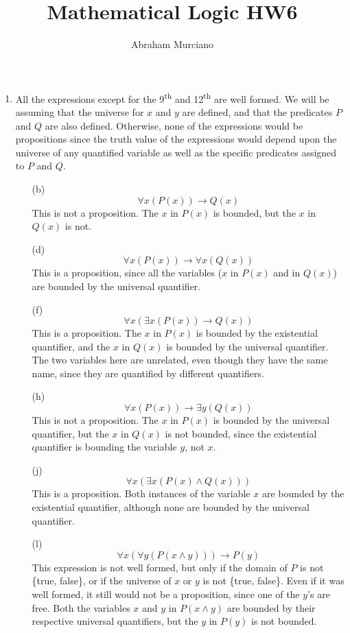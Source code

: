\documentclass[fleqn]{article}
\title{Mathematical Logic HW6}
\author{Abraham Murciano}
\begin{document}
\maketitle

\begin{enumerate}

	\item %
	All the expressions except for the 9\textsuperscript{th} and 12\textsuperscript{th} are well formed. We will be assuming that the universe for \(x\) and \(y\) are defined, and that the predicates \(P\) and \(Q\) are also defined. Otherwise, none of the expressions would be propositions since the truth value of the expressions would depend upon the universe of any quantified variable as well as the specific predicates assigned to \(P\) and \(Q\).
	
	\begin{enumerate}
		\item[(b)]
		\[\forall x (P(x)) \to Q(x)\]
		This is not a proposition. The \(x\) in \(P(x)\) is bounded, but the \(x\) in \(Q(x)\) is not.

		\item[(d)]
		\[\forall x (P(x)) \to \forall x (Q(x))\]
		This is a proposition, since all the variables (\(x\) in \(P(x)\) and in \(Q(x)\)) are bounded by the universal quantifier.

		\item[(f)]
		\[\forall x (\exists x (P(x)) \to Q(x))\]
		This is a proposition. The \(x\) in \(P(x)\) is bounded by the existential quantifier, and the \(x\) in \(Q(x)\) is bounded by the universal quantifier. The two variables here are unrelated, even though they have the same name, since they are quantified by different quantifiers.

		\item[(h)]
		\[\forall x (P(x)) \to \exists y (Q(x))\]
		This is not a proposition. The \(x\) in \(P(x)\) is bounded by the universal quantifier, but the \(x\) in \(Q(x)\) is not bounded, since the existential quantifier is bounding the variable \(y\), not \(x\).

		\item[(j)]
		\[\forall x (\exists x (P(x) \land Q(x)))\]
		This is a proposition. Both instances of the variable \(x\) are bounded by the existential quantifier, although none are bounded by the universal quantifier.

		\item[(l)]
		\[\forall x (\forall y (P(x \land y))) \to P(y)\]
		This expression is not well formed, but only if the domain of \(P\) is not \{true, false\}, or if the universe of \(x\) or \(y\) is not \{true, false\}. Even if it was well formed, it still would not be a proposition, since one of the \(y\)'s are free. Both the variables \(x\) and \(y\) in \(P(x \land y)\) are bounded by their respective universal quantifiers, but the \(y\) in \(P(y)\) is not bounded.
	\end{enumerate}
	

\end{enumerate}
\end{document}
